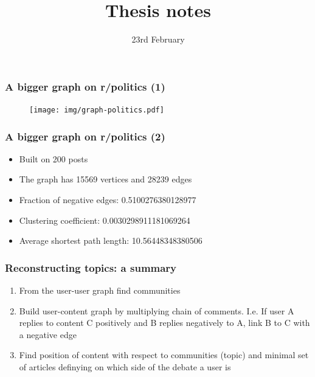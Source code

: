 \documentclass{beamer}
\begin{document}
\title{Thesis notes}
\date{23rd February}
\frame{\titlepage}

\begin{frame}[c]
    \frametitle{A bigger graph on r/politics (1)}
    \begin{figure}[htpb]
        \centering
        \texttt{[image: img/graph-politics.pdf]}
    \end{figure}
    
\end{frame}

\begin{frame}[c]
    \frametitle{A bigger graph on r/politics (2)}
    \begin{itemize}
        \item Built on 200 posts
        \item The graph has 15569 vertices and 28239 edges
        \item Fraction of negative edges: 0.5100276380128977
        \item Clustering coefficient: 0.0030298911181069264
        \item Average shortest path length: 10.56448348380506
    \end{itemize}
\end{frame}

\begin{frame}[c]
    \frametitle{Reconstructing topics: a summary}
    \begin{enumerate}
        \item From the user-user graph find communities
        \item Build user-content graph by multiplying chain of comments.
            I.e. If user A replies to content C positively and B replies
            negatively to A, link B to C with a negative edge
        \item Find position of content with respect to communities (topic) and minimal
            set of articles definying on which side of the debate a user is
    \end{enumerate}
    
\end{frame}
\end{document}
